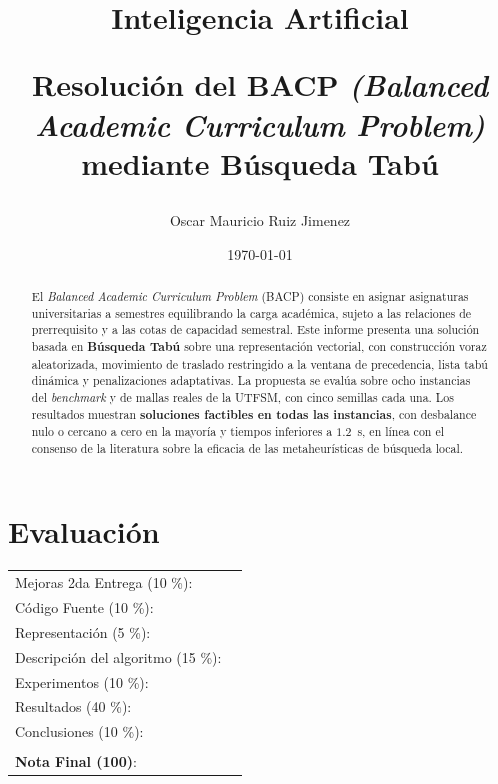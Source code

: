 \documentclass[letter, 10pt]{article}
\begin{document}
\title{Inteligencia Artificial \\ \begin{Large}Resoluci\'on del BACP \textit{(Balanced Academic Curriculum Problem)} mediante B\'usqueda Tab\'u\end{Large}}
\author{Oscar Mauricio Ruiz Jimenez}
\date{\today}
\maketitle


\section*{Evaluaci\'on}

\begin{tabular}{ll}
Mejoras 2da Entrega (10 \%): &  \underline{\hspace{2cm}}\\
C\'odigo Fuente (10 \%): &  \underline{\hspace{2cm}}\\
Representaci\'on (5 \%):  & \underline{\hspace{2cm}} \\
Descripci\'on del algoritmo (15 \%):  & \underline{\hspace{2cm}} \\
Experimentos (10 \%):  & \underline{\hspace{2cm}} \\
Resultados (40 \%):  & \underline{\hspace{2cm}} \\
Conclusiones (10 \%): &  \underline{\hspace{2cm}}\\
 &  \\
\textbf{Nota Final (100)}:   & \underline{\hspace{2cm}}
\end{tabular}
\vspace{2cm}


\begin{abstract}
El \textit{Balanced Academic Curriculum Problem} (BACP) consiste en asignar asignaturas universitarias a semestres equilibrando la carga acad\'emica, sujeto a las relaciones de prerrequisito y a las cotas de capacidad semestral. Este informe presenta una soluci\'on basada en \textbf{B\'usqueda Tab\'u} sobre una representaci\'on vectorial, con construcci\'on voraz aleatorizada, movimiento de traslado restringido a la ventana de precedencia, lista tab\'u din\'amica y penalizaciones adaptativas. La propuesta se eval\'ua sobre ocho instancias del \textit{benchmark} y de mallas reales de la UTFSM, con cinco semillas cada una. Los resultados muestran \textbf{soluciones factibles en todas las instancias}, con desbalance nulo o cercano a cero en la mayor\'ia y tiempos inferiores a $1.2$~s, en l\'inea con el consenso de la literatura sobre la eficacia de las metaheur\'isticas de b\'usqueda local.
\end{abstract}
\end{document}
